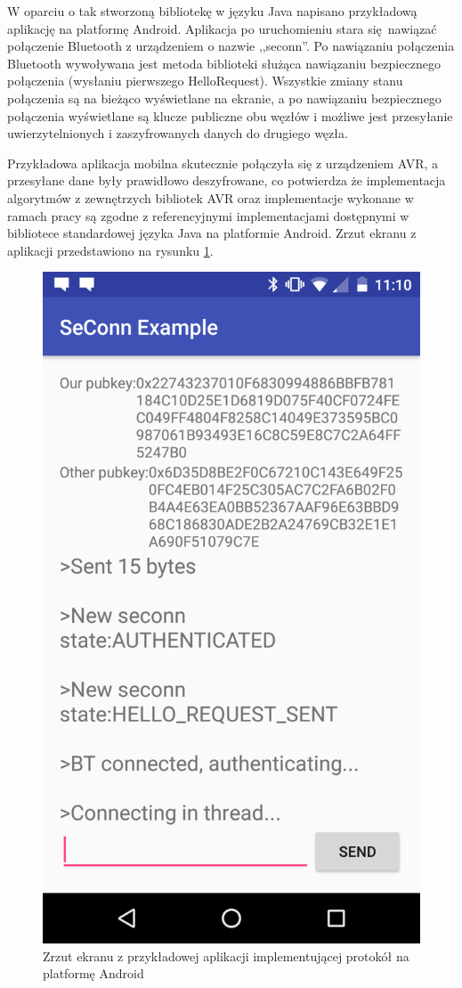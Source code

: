 W oparciu o tak stworzoną bibliotekę w języku Java napisano przykładową aplikację na platformę Android. Aplikacja po uruchomieniu stara się nawiązać połączenie Bluetooth z urządzeniem o nazwie ,,seconn''. Po nawiązaniu połączenia Bluetooth wywoływana jest metoda biblioteki służąca nawiązaniu bezpiecznego połączenia (wysłaniu pierwszego HelloRequest). Wszystkie zmiany stanu połączenia są na bieżąco wyświetlane na ekranie, a po nawiązaniu bezpiecznego połączenia wyświetlane są klucze publiczne obu węzłów i możliwe jest przesyłanie uwierzytelnionych i zaszyfrowanych danych do drugiego węzła.

Przykładowa aplikacja mobilna skutecznie połączyła się z urządzeniem AVR, a przesyłane dane były prawidłowo deszyfrowane, co potwierdza że implementacja algorytmów z zewnętrzych bibliotek AVR oraz implementacje wykonane w ramach pracy są zgodne z referencyjnymi implementacjami dostępnymi w bibliotece standardowej języka Java na platformie Android. Zrzut ekranu z aplikacji przedstawiono na rysunku \ref{fig:android}.

\begin{figure}
\centering
\includegraphics[height=0.6\textheight]{images/android.png}
\caption{Zrzut ekranu z przykładowej aplikacji implementującej protokół na platformę Android}
\label{fig:android}
\end{figure}
